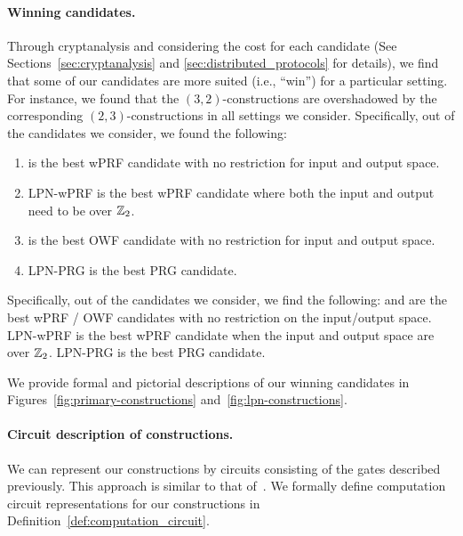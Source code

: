 \paragraph{Winning candidates.}
Through cryptanalysis and considering the cost for each candidate (See Sections~\ref{sec:cryptanalysis} and \ref{sec:distributed_protocols} for details), we find that some of our candidates are more suited (i.e., ``win'') for a particular setting.
\iffull
For instance, we found that the $(3,2)$-constructions are overshadowed by the corresponding $(2,3)$-constructions in all settings we consider. Specifically, out of the candidates we consider, we found the following:
\begin{enumerate}
    \item \ttwPRF is the best wPRF candidate with no restriction for input and output space. 
    \item LPN-wPRF is the best wPRF candidate where both the input and output need to be over $\mathbb{Z}_2$.
    \item \ttOWF is the best OWF candidate with no restriction for input and output space.
    \item LPN-PRG is the best PRG candidate.
\end{enumerate}
\else
Specifically, out of the candidates we consider, we find the following: \ttwPRF and \ttOWF are the best wPRF / OWF candidates with no restriction on the input/output space. LPN-wPRF is the best wPRF candidate when the input and output space are over $\mathbb{Z}_2$. LPN-PRG is the best PRG candidate.
\fi

We provide formal and pictorial descriptions of our winning candidates in Figures~\ref{fig:primary-constructions} and~\ref{fig:lpn-constructions}.

\iffull
\paragraph{Circuit description of constructions.}
We can represent our constructions by circuits consisting of the gates described previously. This approach is similar to that of~\cite{boyle2019-fss-preprocess}. We formally define computation circuit representations for our constructions in Definition~\ref{def:computation_circuit}.

